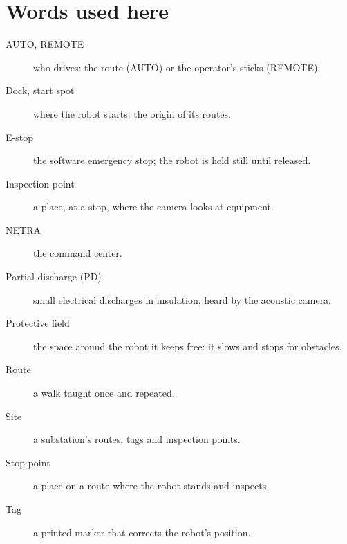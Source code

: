 \chapter{Words used here}
\label{ch:u-glossary}

\begin{description}
  \item[AUTO, REMOTE] who drives: the route (AUTO) or the operator's sticks (REMOTE).
  \item[Dock, start spot] where the robot starts; the origin of its routes.
  \item[E-stop] the software emergency stop; the robot is held still until released.
  \item[Inspection point] a place, at a stop, where the camera looks at equipment.
  \item[NETRA] the command center.
  \item[Partial discharge (PD)] small electrical discharges in insulation, heard by the acoustic
    camera.
  \item[Protective field] the space around the robot it keeps free: it slows and stops for
    obstacles.
  \item[Route] a walk taught once and repeated.
  \item[Site] a substation's routes, tags and inspection points.
  \item[Stop point] a place on a route where the robot stands and inspects.
  \item[Tag] a printed marker that corrects the robot's position.
\end{description}
